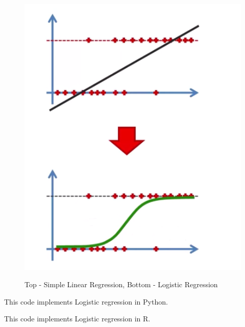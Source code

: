 \documentclass[runningheads,a4paper]{llncs}
\begin{document}
\begin{figure}[H]
\centering
\begin{center}
\includegraphics[scale=0.8]{pics/logistic_basic}
\label{uloha1:pic1}
\caption{Top - Simple Linear Regression, Bottom - Logistic Regression} 
\end{center}
\end{figure}

\lstset{basicstyle=\large}



This code implements Logistic regression in Python.
 


This code implements Logistic regression in R.
 
\end{document}
